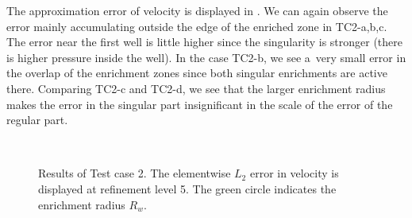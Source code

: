 The approximation error of velocity is displayed in . We can again observe
the error mainly accumulating outside the edge of the enriched zone in TC2-a,b,c.
The error near the first well is little higher since the singularity is stronger (there is higher pressure inside the well).
In the case TC2-b, we see a~very small error in the overlap of the enrichment zones
since both singular enrichments are active there.
Comparing TC2-c and TC2-d, we see that the larger enrichment radius makes the error in the singular part insignificant
in the scale of the error of the regular part.

%
\begin{figure}[!htb]
    \centering
     \\
    \caption[Error distribution in Test case 2.]
    {Results of Test case 2. The elementwise $L_2$ error in velocity is displayed at refinement level 5.
    The green circle indicates the enrichment radius $R_w$. }
    \label{fig:mh_tc2_error}
\end{figure}
%

